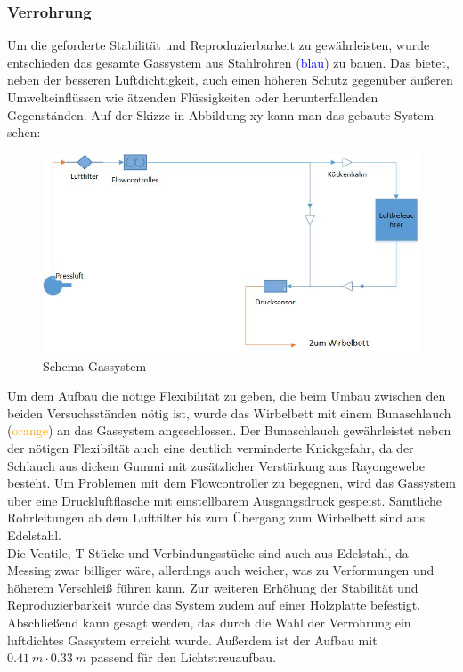 \subsubsection{Verrohrung}

Um die geforderte Stabilität und Reproduzierbarkeit zu gewährleisten, wurde entschieden das gesamte Gassystem aus Stahlrohren (\textcolor{blue}{blau}) zu bauen. Das bietet, neben der besseren Luftdichtigkeit, auch einen höheren Schutz gegenüber äußeren Umwelteinflüssen wie ätzenden Flüssigkeiten oder herunterfallenden Gegenständen.
Auf der Skizze in Abbildung xy kann man das gebaute System sehen:
\hfill \\

\begin{figure}[h]
	\begin{center}
		\includegraphics[scale=0.6]{Aufbau_Gassystem.jpg}
		\caption{Schema Gassystem}
	\end{center}
\end{figure}


Um dem Aufbau die nötige Flexibilität zu geben, die beim Umbau zwischen den beiden Versuchsständen nötig ist, wurde das Wirbelbett mit einem Bunaschlauch (\textcolor{orange}{orange}) an das Gassystem angeschlossen. Der Bunaschlauch gewährleistet neben der nötigen Flexibiltät auch eine deutlich verminderte Knickgefahr, da der Schlauch aus dickem Gummi mit zusätzlicher Verstärkung aus Rayongewebe besteht.
Um Problemen mit dem Flowcontroller zu begegnen, wird das Gassystem über eine Druckluftflasche mit einstellbarem Ausgangsdruck gespeist. Sämtliche Rohrleitungen ab dem Luftfilter bis zum Übergang zum Wirbelbett sind aus Edelstahl. \\
Die Ventile, T-Stücke und Verbindungsstücke sind auch aus Edelstahl, da Messing zwar billiger wäre, allerdings auch weicher, was zu Verformungen und höherem Verschleiß führen kann. Zur weiteren Erhöhung der Stabilität und Reproduzierbarkeit wurde das System zudem auf einer Holzplatte befestigt. \\
Abschließend kann gesagt werden, das durch die Wahl der Verrohrung ein luftdichtes Gassystem erreicht wurde. Außerdem ist der Aufbau mit $\SI{0,41}{m} \cdot \SI{0,33}{m}$ passend für den Lichtstreuaufbau.


